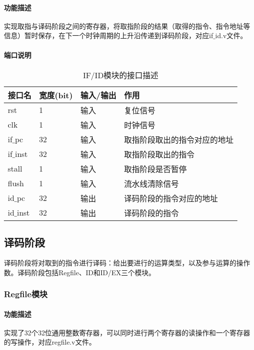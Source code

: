 \paragraph{功能描述}
\quad

\quad

实现取指与译码阶段之间的寄存器，将取指阶段的结果（取得的指令、指令地址等信息）暂时保存，在下一个时钟周期的上升沿传递到译码阶段，对应if$\_$id.v文件。
\paragraph{端口说明}
\quad

\quad
\begin{table}[H]
	\centering
	\caption{IF/ID模块的接口描述}
	\begin{tabular}{|l|l|l|l|}
		\hline
		接口名 & 宽度(bit) & 输入/输出 & 作用 \\
		\hline
		rst & 1 & 输入 & 复位信号 \\
		\hline
		clk & 1 & 输入 & 时钟信号 \\
		\hline
		if$\_$pc & 32 & 输入 & 取指阶段取出的指令对应的地址 \\
		\hline
		if$\_$inst & 32 & 输入 & 取指阶段取出的指令 \\
		\hline
		stall & 1 & 输入 & 取指阶段是否暂停 \\
		\hline
		flush & 1 & 输入 & 流水线清除信号 \\
		\hline
		id$\_$pc & 32 & 输出 & 译码阶段的指令对应的地址 \\
		\hline
		id$\_$inst & 32 & 输出 & 译码阶段的指令 \\
		\hline
	\end{tabular}
\end{table}
\subsection{译码阶段}
译码阶段将对取到的指令进行译码：给出要进行的运算类型，以及参与运算的操作数。译码阶段包括Regfile、ID和ID/EX三个模块。
\subsubsection{Regfile模块}
\paragraph{功能描述}
\quad

\quad

实现了32个32位通用整数寄存器，可以同时进行两个寄存器的读操作和一个寄存器的写操作，对应regfile.v文件。

